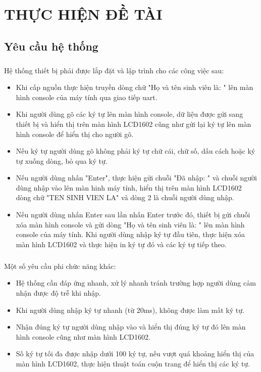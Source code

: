 \chapter{THỰC HIỆN ĐỀ TÀI}
\section{Yêu cầu hệ thống}
\paragraph{}
Hệ thống thiết bị phải được lắp đặt và lập trình cho các công việc sau:
\begin{itemize}
    \item Khi cấp nguồn thực hiện truyền dòng chữ "Họ và tên sinh viên là: " lên màn hình console của máy tính qua giao tiếp \acrshort{uart}.
    \item Khi người dùng gõ các ký tự lên màn hình console, dữ liệu được gửi sang thiết bị và hiển thị trên màn hình LCD1602 cũng như gửi lại ký tự lên màn hình console để hiển thị cho người gõ.
    \item Nếu ký tự người dùng gõ không phải ký tự chữ cái, chữ số, dấu cách hoặc ký tự xuống dòng, bỏ qua ký tự.
    \item Nếu người dùng nhấn "Enter", thực hiện gửi chuỗi "Đã nhập: " và chuỗi người dùng nhập vào lên màn hinh máy tính, hiển thị trên màn hình LCD1602 dòng chữ "TEN SINH VIEN LA" và dòng 2 là chuỗi người dùng nhập.
    \item Nếu người dùng nhấn Enter sau lần nhấn Enter trước đó, thiết bị gửi chuỗi xóa màn hình console và gửi dòng "Họ và tên sinh viên là: " lên màn hình console của máy tính. Khi người dùng nhập ký tự đầu tiên, thực hiện xóa màn hình LCD1602 và thực hiện in ký tự đó và các ký tự tiếp theo.
\end{itemize}

\paragraph{}
Một số yêu cầu phi chức năng khác:
\begin{itemize}
    \item Hệ thống cần đáp ứng nhanh, xử lý nhanh tránh trường hợp người dùng cảm nhận được độ trễ khi nhập.
    \item Khi người dùng nhập ký tự nhanh (từ 20ms), không được làm mất ký tự.
    \item Nhận đúng ký tự người dùng nhập vào và hiển thị đúng ký tự đó lên màn hình console cũng như màn hình LCD1602.
    \item Số ký tự tối đa được nhập dưới 100 ký tự, nếu vượt quá khoảng hiển thị của màn hình LCD1602, thực hiện thuật toán cuộn trang để hiển thị các ký tự.
\end{itemize}
